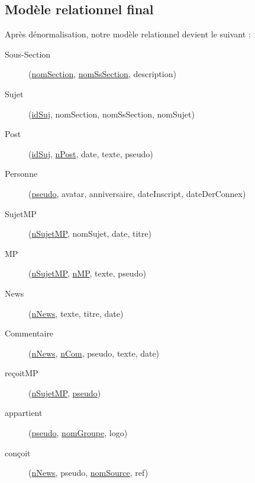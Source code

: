 \subsection{Modèle relationnel final}
Après dénormalisation, notre modèle relationnel devient le suivant :
\begin{description}
	\item[Sous-Section] (\underline{nomSection}, \underline{nomSsSection}, description)
	\item[Sujet] (\underline{idSuj}, nomSection, nomSsSection, nomSujet)
	\item[Post] (\underline{idSuj}, \underline{n\degree Post}, date, texte, pseudo)
	\item[Personne] (\underline{pseudo}, avatar, anniversaire, dateInscript, dateDerConnex)
	\item[SujetMP] (\underline{n\degree SujetMP}, nomSujet, date, titre)
	\item[MP] (\underline{n\degree SujetMP}, \underline{n\degree MP}, texte, pseudo)
	\item[News] (\underline{n\degree News}, texte, titre, date)
	\item[Commentaire] (\underline{n\degree News}, \underline{n\degree Com}, pseudo, texte, date)
	\item[reçoitMP] (\underline{n\degree SujetMP}, \underline{pseudo})
	\item[appartient] (\underline{pseudo}, \underline{nomGroupe}, logo)
	\item[conçoit] (\underline{n\degree News}, pseudo, \underline{nomSource}, ref)
\end{description}

